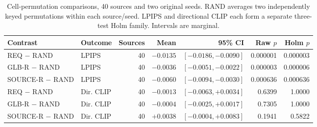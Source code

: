 \begin{table}[!t]
\centering\small
\caption{Cell-permutation comparisons, 40 sources and two original seeds. RAND averages two independently keyed permutations within each source/seed. LPIPS and directional CLIP each form a separate three-test Holm family. Intervals are marginal.}
\label{tab:r91-permutation}
\begin{tabular}{llrrrrr}
\toprule
Contrast & Outcome & Sources & Mean & 95\% CI & Raw $p$ & Holm $p$\\
\midrule
REQ $-$ RAND & LPIPS & 40 & $-0.0135$ & $[-0.0186, -0.0090]$ & 0.000001 & 0.000003\\
GLB-R $-$ RAND & LPIPS & 40 & $-0.0036$ & $[-0.0051, -0.0022]$ & 0.000003 & 0.000006\\
SOURCE-R $-$ RAND & LPIPS & 40 & $-0.0060$ & $[-0.0094, -0.0030]$ & 0.000636 & 0.000636\\
REQ $-$ RAND & Dir. CLIP & 40 & $-0.0013$ & $[-0.0063, +0.0034]$ & 0.6399 & 1.0000\\
GLB-R $-$ RAND & Dir. CLIP & 40 & $-0.0004$ & $[-0.0025, +0.0017]$ & 0.7305 & 1.0000\\
SOURCE-R $-$ RAND & Dir. CLIP & 40 & $+0.0038$ & $[-0.0004, +0.0083]$ & 0.1941 & 0.5822\\
\bottomrule
\end{tabular}
\end{table}
